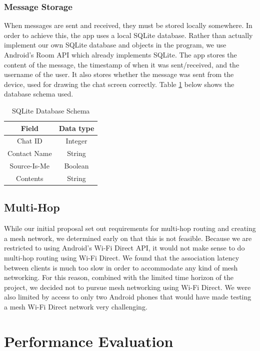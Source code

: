 \documentclass[10pt]{article}
\begin{document}
\subsubsection{Message Storage}
When messages are sent and received, they must be stored locally somewhere. In order to achieve this, the app uses a local SQLite database. Rather than actually implement our own SQLite database and objects in the program, we use Android's Room API which already implements SQLite. The app stores the content of the message, the timestamp of when it was sent/received, and the username of the user. It also stores whether the message was sent from the device, used for drawing the chat screen correctly. Table \ref{backend:sqlite} below shows the database schema used. 
\begin{table}[h]
    \begin{center}
    \begin{tabular}{|c|c|} \hline
        Field & Data type \\ \hline
        Chat ID & Integer \\
        Contact Name & String \\
        Source-Is-Me & Boolean \\
        Contents & String \\ \hline
    \end{tabular}
    \end{center}
    \caption{SQLite Database Schema}
    \label{backend:sqlite}
\end{table}


\subsection{Multi-Hop}
While our initial proposal set out requirements for multi-hop routing and creating a mesh network, we determined early on that this is not feasible. Because we are restricted to using Android's Wi-Fi Direct API, it would not make sense to do multi-hop routing using Wi-Fi Direct. We found that the association latency between clients is much too slow in order to accommodate any kind of mesh networking. For this reason, combined with the limited time horizon of the project, we decided not to pursue mesh networking using Wi-Fi Direct. We were also limited by access to only two Android phones that would have made testing a mesh Wi-Fi Direct network very challenging.

\section{Performance Evaluation}
\end{document}
